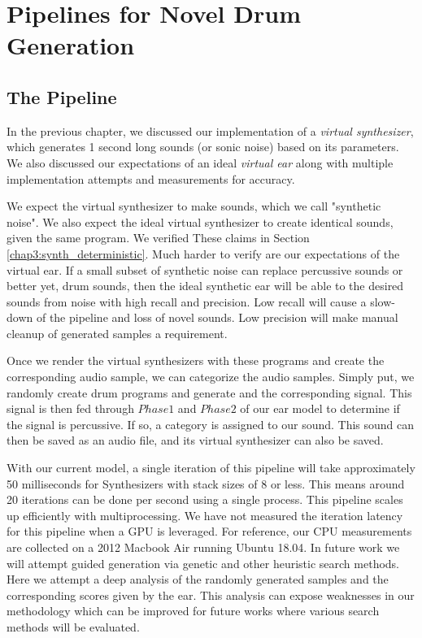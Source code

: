 \documentclass[\main/thesis.tex]{subfiles}
\begin{document}
\chapter{Pipelines for Novel Drum Generation}

\label{gens}
\section{The Pipeline}
 In the previous chapter, we discussed our implementation of a \emph{virtual synthesizer}, which generates 1 second long sounds (or sonic noise) based on its parameters. We also discussed our expectations of an ideal \emph{virtual ear} along with multiple implementation attempts and measurements for accuracy. 
 
 We expect the virtual synthesizer to make sounds, which we call "synthetic noise". We also expect the ideal virtual synthesizer to create identical sounds, given the same program. We verified These claims in Section \ref{chap3:synth_deterministic}. Much harder to verify are our expectations of the virtual ear. If a small subset of synthetic noise can replace percussive sounds or better yet, drum sounds, then the ideal synthetic ear will be able to the desired sounds from noise with high recall and precision. Low recall will cause a slow-down of the pipeline and loss of novel sounds. Low precision will make manual cleanup of generated samples a requirement. 

  Once we render the virtual synthesizers with these programs and create the corresponding audio sample, we can categorize the audio samples. Simply put, we randomly create drum programs and generate and the corresponding signal. This signal is then fed through $Phase 1$ and $Phase 2$ of our ear model to determine if the signal is percussive. If so, a category is assigned to our sound. This sound can then be saved as an audio file, and its virtual synthesizer can also be saved.
 
 With our current model, a single iteration of this pipeline will take approximately 50 milliseconds for Synthesizers with stack sizes of 8 or less. This means around 20 iterations can be done per second using a single process. This pipeline scales up efficiently with multiprocessing. We have not measured the iteration latency for this pipeline when a GPU is leveraged. For reference, our CPU measurements are collected on a 2012 Macbook Air running Ubuntu 18.04.
 In future work we will attempt guided generation via genetic and other heuristic search methods. Here we attempt a deep analysis of the randomly generated samples and the corresponding scores given by the ear. This analysis can expose weaknesses in our methodology which can be improved for future works where various search methods will be evaluated.
  
\end{document}
